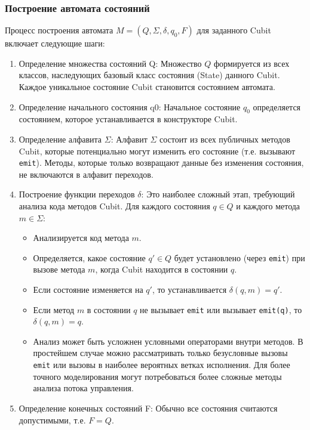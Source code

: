 \documentclass[14pt, russian]{scrartcl}
\begin{document}
\subsubsection{Построение автомата состояний}

Процесс построения автомата $M = (Q, \Sigma, \delta, q_0, F)$ для заданного Cubit включает следующие шаги:

\begin{enumerate}
    \item {Определение множества состояний Q:} Множество $Q$ формируется из всех классов, наследующих базовый класс состояния (State) данного Cubit. Каждое уникальное состояние Cubit становится состоянием автомата.
    \item {Определение начального состояния q0:} Начальное состояние $q_0$ определяется состоянием, которое устанавливается в конструкторе Cubit.
    \item {Определение алфавита $\Sigma$:} Алфавит $\Sigma$ состоит из всех публичных методов Cubit, которые потенциально могут изменить его состояние (т.е. вызывают \texttt{emit}). Методы, которые только возвращают данные без изменения состояния, не включаются в алфавит переходов.
    \item {Построение функции переходов $\delta$:} Это наиболее сложный этап, требующий анализа кода методов Cubit. Для каждого состояния $q \in Q$ и каждого метода $m \in \Sigma$:
        \begin{itemize}
            \item Анализируется код метода $m$.
            \item Определяется, какое состояние $q' \in Q$ будет установлено (через \texttt{emit}) при вызове метода $m$, когда Cubit находится в состоянии $q$.
            \item Если состояние изменяется на $q'$, то устанавливается $\delta(q, m) = q'$.
            \item Если метод $m$ в состоянии $q$ не вызывает \texttt{emit} или вызывает \texttt{emit(q)}, то $\delta(q, m) = q$.
            \item Анализ может быть усложнен условными операторами внутри методов. В простейшем случае можно рассматривать только безусловные вызовы \texttt{emit} или вызовы в наиболее вероятных ветках исполнения. Для более точного моделирования могут потребоваться более сложные методы анализа потока управления.
        \end{itemize}
    \item {Определение конечных состояний F:} Обычно все состояния считаются допустимыми, т.е. $F = Q$.
\end{enumerate}
\end{document}
